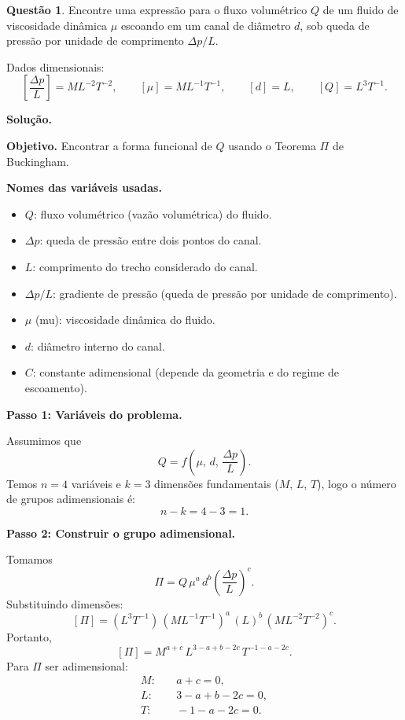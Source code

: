 \documentclass[12pt,a4paper]{article}
\theoremstyle{definition}
\newtheorem{questao}{Quest\~ao}
\newenvironment{solucao}{%
  \par\medskip\noindent\textbf{Solu\c{c}\~ao.}\quad\ignorespaces
}{%
  \par\medskip
}
\begin{document}
\begin{questao}
Encontre uma express\~ao para o fluxo volum\'etrico $Q$ de um fluido de viscosidade din\^amica $\mu$ escoando em um canal de di\^ametro $d$, sob queda de press\~ao por unidade de comprimento $\Delta p/L$.

Dados dimensionais:
\[
\left[\frac{\Delta p}{L}\right] = M L^{-2}T^{-2},
\qquad
[\mu] = M L^{-1}T^{-1},
\qquad
[d]=L,
\qquad
[Q]=L^3T^{-1}.
\]
\end{questao}

\begin{solucao}

\noindent\textbf{Objetivo.} Encontrar a forma funcional de $Q$ usando o Teorema $\Pi$ de Buckingham.

\medskip
\noindent\textbf{Nomes das vari\'aveis usadas.}
\begin{itemize}
  \item $Q$: fluxo volum\'etrico (vaz\~ao volum\'etrica) do fluido.
  \item $\Delta p$: queda de press\~ao entre dois pontos do canal.
  \item $L$: comprimento do trecho considerado do canal.
  \item $\Delta p/L$: gradiente de press\~ao (queda de press\~ao por unidade de comprimento).
  \item $\mu$ (mu): viscosidade din\^amica do fluido.
  \item $d$: di\^ametro interno do canal.
  \item $C$: constante adimensional (depende da geometria e do regime de escoamento).
\end{itemize}

\medskip
\noindent\textbf{Passo 1: Vari\'aveis do problema.}

Assumimos que
\[
Q = f\!\left(\mu,\,d,\,\frac{\Delta p}{L}\right).
\]
Temos $n=4$ vari\'aveis e $k=3$ dimens\~oes fundamentais ($M$, $L$, $T$), logo o n\'umero de grupos adimensionais \'e:
\[
n-k = 4-3 = 1.
\]

\medskip
\noindent\textbf{Passo 2: Construir o grupo adimensional.}

Tomamos
\[
\Pi = Q\,\mu^a\,d^b\left(\frac{\Delta p}{L}\right)^c.
\]
Substituindo dimens\~oes:
\[
[\Pi] = (L^3T^{-1})\,(ML^{-1}T^{-1})^a\,(L)^b\,(ML^{-2}T^{-2})^c.
\]
Portanto,
\[
[\Pi] = M^{a+c}\,L^{3-a+b-2c}\,T^{-1-a-2c}.
\]
Para $\Pi$ ser adimensional:
\begin{align}
M:&\quad a+c=0, \\
L:&\quad 3-a+b-2c=0, \\
T:&\quad -1-a-2c=0.
\end{align}


\end{solucao}
\end{document}

